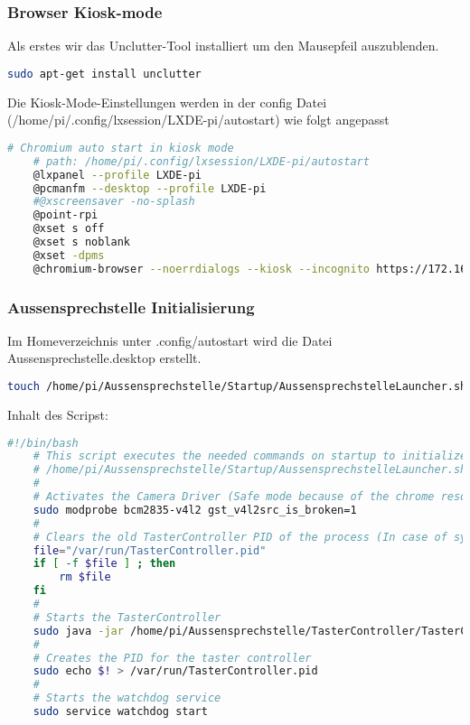 \subsubsection{Browser Kiosk-mode}
Als erstes wir das Unclutter-Tool installiert um den Mausepfeil auszublenden.
\begin{lstlisting}[backgroundcolor = \color{snippetcolor},
language = bash,
xleftmargin = 1cm,
framexleftmargin = 0.1em,
breaklines=true]
	sudo apt-get install unclutter
\end{lstlisting}
Die Kiosk-Mode-Einstellungen werden in der config Datei  (/home/pi/.config/lxsession/LXDE-pi/autostart) wie folgt angepasst
\begin{lstlisting}[backgroundcolor = \color{snippetcolor},
language = bash,
xleftmargin = 1cm,
framexleftmargin = 0.1em,
breaklines=true]
	# Chromium auto start in kiosk mode
	# path: /home/pi/.config/lxsession/LXDE-pi/autostart
	@lxpanel --profile LXDE-pi
	@pcmanfm --desktop --profile LXDE-pi
	#@xscreensaver -no-splash
	@point-rpi
	@xset s off
	@xset s noblank
	@xset -dpms
	@chromium-browser --noerrdialogs --kiosk --incognito https://172.16.111.99/server
\end{lstlisting}

\subsubsection{Aussensprechstelle Initialisierung}
Im Homeverzeichnis unter .config/autostart wird die Datei Aussensprechstelle.desktop erstellt.
\begin{lstlisting}[backgroundcolor = \color{snippetcolor},
language = bash,
xleftmargin = 1cm,
framexleftmargin = 0.1em,
breaklines=true]
	touch /home/pi/Aussensprechstelle/Startup/AussensprechstelleLauncher.sh
\end{lstlisting}
Inhalt des Scripst:
\begin{lstlisting}[backgroundcolor = \color{snippetcolor},
language = bash,
xleftmargin = 1cm,
framexleftmargin = 0.1em,
breaklines=true]
	#!/bin/bash
	# This script executes the needed commands on startup to initialize the Aussensprechstelle
	# /home/pi/Aussensprechstelle/Startup/AussensprechstelleLauncher.sh
	#
	# Activates the Camera Driver (Safe mode because of the chrome resolution bug)
	sudo modprobe bcm2835-v4l2 gst_v4l2src_is_broken=1
	#
	# Clears the old TasterController PID of the process (In case of system shutdown)
	file="/var/run/TasterController.pid"
	if [ -f $file ] ; then
		rm $file
	fi
	#
	# Starts the TasterController
	sudo java -jar /home/pi/Aussensprechstelle/TasterController/TasterController.jar &
	#
	# Creates the PID for the taster controller
	sudo echo $! > /var/run/TasterController.pid
	#
	# Starts the watchdog service
	sudo service watchdog start	
\end{lstlisting}


